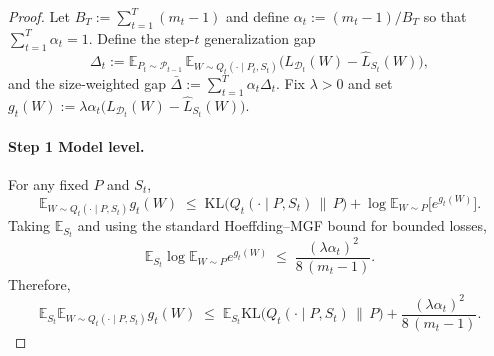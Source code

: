 \documentclass[10pt]{article} %
\begin{document}
\begin{proof}
    


Let $B_T:=\sum_{t=1}^T (m_t-1)$ and define $\alpha_t:=(m_t-1)/B_T$ so that $\sum_{t=1}^T\alpha_t=1$.
Define the step-$t$ generalization gap
\[
\Delta_t
:=\mathbb E_{P_t\sim\mathcal P_{t-1}}\,
\mathbb E_{W\sim Q_t(\cdot\mid P_t,S_t)}
\big(L_{\mathcal D_t}(W)-\hat L_{S_t}(W)\big),
\]
and the size-weighted gap $\bar\Delta:=\sum_{t=1}^T \alpha_t \Delta_t$.
Fix $\lambda>0$ and set
\(
g_t(W):=\lambda\alpha_t\big(L_{\mathcal D_t}(W)-\hat L_{S_t}(W)\big).
\)

\paragraph{Step 1 Model level.}
For any fixed $P$ and $S_t$,
\begin{equation}
\label{eq:dv-w}
\mathbb E_{W\sim Q_t(\cdot\mid P,S_t)} g_t(W)
\;\le\;
\mathrm{KL}\!\big(Q_t(\cdot\mid P,S_t)\,\|\,P\big)
+\log\mathbb E_{W\sim P}\!\big[e^{g_t(W)}\big].
\end{equation}
Taking $\mathbb E_{S_t}$ and using the standard Hoeffding--MGF bound for bounded losses,
\begin{equation}
\label{eq:mgf-mean-gap}
\mathbb E_{S_t}\log\mathbb E_{W\sim P} e^{g_t(W)}
\;\le\; \frac{(\lambda\alpha_t)^2}{8\,(m_t-1)}.
\end{equation}
Therefore,
\begin{equation}
\label{eq:model-step}
\mathbb E_{S_t}\mathbb E_{W\sim Q_t(\cdot\mid P,S_t)} g_t(W)
\;\le\;
\mathbb E_{S_t}\mathrm{KL}\!\big(Q_t(\cdot\mid P,S_t)\,\|\,P\big)
+\frac{(\lambda\alpha_t)^2}{8\,(m_t-1)}.
\end{equation}

\end{proof}
\end{document}
